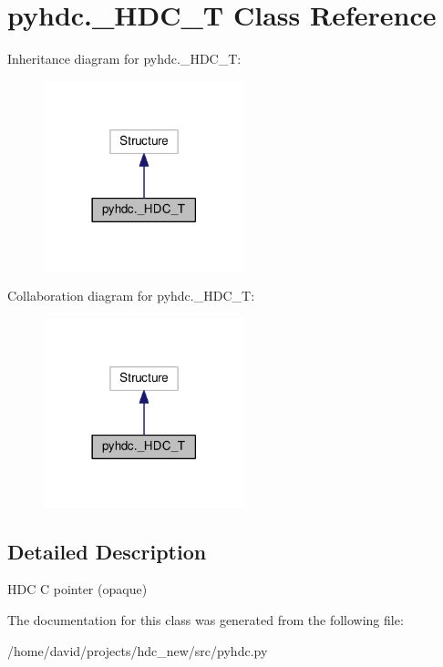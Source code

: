 \hypertarget{classpyhdc_1_1___h_d_c___t}{}\section{pyhdc.\+\_\+\+H\+D\+C\+\_\+T Class Reference}
\label{classpyhdc_1_1___h_d_c___t}


Inheritance diagram for pyhdc.\+\_\+\+H\+D\+C\+\_\+T\+:\nopagebreak
\begin{figure}[H]
\begin{center}
\leavevmode
\includegraphics[width=165pt]{classpyhdc_1_1___h_d_c___t__inherit__graph}
\end{center}
\end{figure}


Collaboration diagram for pyhdc.\+\_\+\+H\+D\+C\+\_\+T\+:\nopagebreak
\begin{figure}[H]
\begin{center}
\leavevmode
\includegraphics[width=165pt]{classpyhdc_1_1___h_d_c___t__coll__graph}
\end{center}
\end{figure}


\subsection{Detailed Description}
\begin{DoxyVerb}HDC C pointer (opaque)
\end{DoxyVerb}
 

The documentation for this class was generated from the following file\+:\begin{DoxyCompactItemize}
\item 
/home/david/projects/hdc\+\_\+new/src/pyhdc.\+py\end{DoxyCompactItemize}
